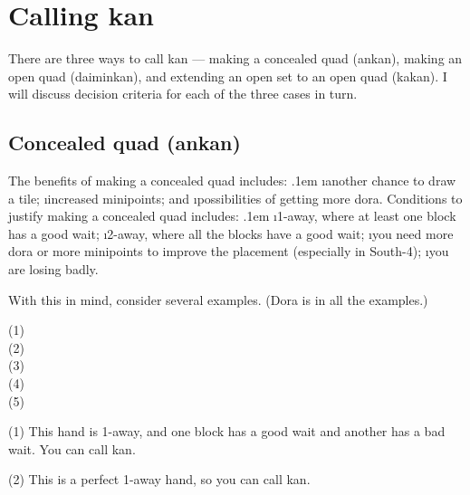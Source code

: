 \newpage

\section{Calling {\jap kan}} \label{sec:kong}  

There are three ways to call {\jap kan} --- making a concealed quad ({\jap ankan}), making an open quad ({\jap daiminkan}), and extending an open set to an open quad ({\jap kakan}). I will discuss decision criteria for each of the three cases in turn.

\subsection{Concealed quad ({\jap ankan})}
The benefits of making a concealed quad includes:
\bi \itemsep.1em
\i another chance to draw a tile;
\i increased minipoints; and
\i possibilities of getting more {\jap dora}.
\ei
Conditions to justify making a concealed quad includes:
\bi \itemsep.1em
\i 1-away, where at least one block has a good wait;
\i 2-away, where all the blocks have a good wait;
\i you need more {\jap dora} or more minipoints to improve the placement (especially in South-4);
\i you are losing badly.
\ei

With this in mind, consider several examples. ({\jap Dora} is {\LARGE\xi} in all the examples.)

\bp
{\small (1)}
\bei\bei\bei\bei\\
{\small (2)}
\bei\bei\bei\bei\\
{\small (3)}
\bei\bei\bei\bei\\
{\small (4)}
\bei\bei\bei\bei\bai\\
{\small (5)}
\bei\bei\bei\bei\bai\bai\\
\ep

\noindent (1) This hand is 1-away, and one block has a good wait and another has a bad wait. You can call {\jap kan}. 

\noindent (2) This is a perfect 1-away hand, so you can call {\jap kan}.

